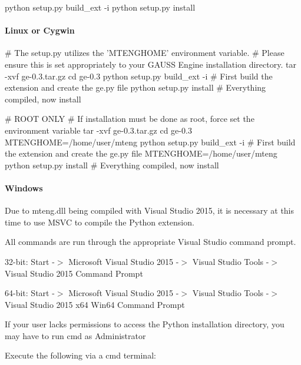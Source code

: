 \begin{DoxyCode}
python setup.py build\_ext -i
python setup.py install
\end{DoxyCode}


\paragraph*{Linux or Cygwin}


\begin{DoxyCode}
\textcolor{preprocessor}{# The setup.py utilizes the 'MTENGHOME' environment variable.}
\textcolor{preprocessor}{}\textcolor{preprocessor}{# Please ensure this is set appropriately to your GAUSS Engine installation directory.}
\textcolor{preprocessor}{}tar -xvf ge-0.3.tar.gz
cd ge-0.3
python setup.py build\_ext -i      # First build the extension and create the ge.py file
python setup.py install           # Everything compiled, now install

\textcolor{preprocessor}{# ROOT ONLY}
\textcolor{preprocessor}{}\textcolor{preprocessor}{# If installation must be done as root, force set the environment variable}
\textcolor{preprocessor}{}tar -xvf ge-0.3.tar.gz
cd ge-0.3
MTENGHOME=/home/user/mteng python setup.py build\_ext -i # First build the extension and create the ge.py 
      file
MTENGHOME=/home/user/mteng python setup.py install      # Everything compiled, now install
\end{DoxyCode}


\paragraph*{Windows}

Due to {\ttfamily mteng.\-dll} being compiled with Visual Studio 2015, it is necessary at this time to use M\-S\-V\-C to compile the Python extension.

All commands are run through the appropriate Visual Studio command prompt.

32-\/bit\-: {\ttfamily Start -\/$>$ Microsoft Visual Studio 2015 -\/$>$ Visual Studio Tools -\/$>$ Visual Studio 2015 Command Prompt}

64-\/bit\-: {\ttfamily Start -\/$>$ Microsoft Visual Studio 2015 -\/$>$ Visual Studio Tools -\/$>$ Visual Studio 2015 x64 Win64 Command Prompt}

If your user lacks permissions to access the Python installation directory, you may have to run {\ttfamily cmd} as Administrator

Execute the following via a {\ttfamily cmd} terminal\-:


